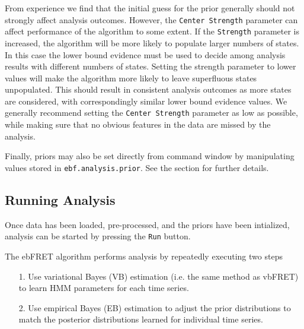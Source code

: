 \documentclass[12pt,article,oldfontcommands]{memoir}
\begin{document}
From experience we find that the initial guess for the prior generally should not strongly affect analysis outcomes. However, the \texttt{Center Strength} parameter can affect performance of the algorithm to some extent. If the \texttt{Strength} parameter is increased, the algorithm will be more likely to populate larger numbers of states. In this case the lower bound evidence must be used to decide among analysis results with different numbers of states. Setting the strength parameter to lower values will make the algorithm more likely to leave superfluous states unpopulated. This should result in consistent analysis outcomes as more states are considered, with correspondingly similar lower bound evidence values. We generally recommend setting the \texttt{Center Strength} parameter as low as possible, while making sure that no obvious features in the data are missed by the analysis.

Finally, priors may also be set directly from command window by manipulating values stored in \texttt{ebf.analysis.prior}. See the \emph{} section for further details.

\subsection{Running Analysis}

Once data has been loaded, pre-processed, and the priors have been intialized, analysis can be started by pressing the \texttt{Run} button.

The ebFRET algorithm performs analysis by repeatedly executing two steps

\begin{itemize}
\item[1.] Use variational Bayes (VB) estimation (i.e. the same method as vbFRET) to learn HMM parameters for each time series.
\item[2.] Use empirical Bayes (EB) estimation to adjust the prior distributions to match the posterior distributions learned for individual time series.
\end{itemize}
\end{document}
